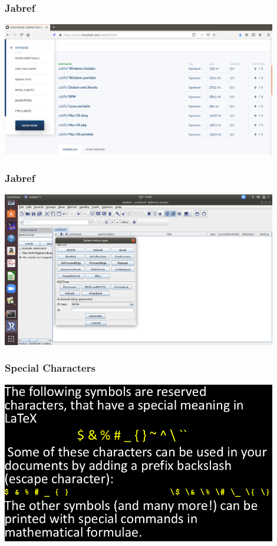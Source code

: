 \documentclass{beamer}
\begin{document}
	\begin{frame}		
\frametitle{\bf Jabref}
\includegraphics[width=12cm]{JR1}
\end{frame}
			
				\begin{frame}		
			\frametitle{\bf Jabref}
		\includegraphics[width=12cm]{JR}	
		\end{frame}
	\begin{frame}
	\frametitle{\bf Special Characters}
		\includegraphics[width=12cm]{SY}
	\end{frame}
\end{document}

